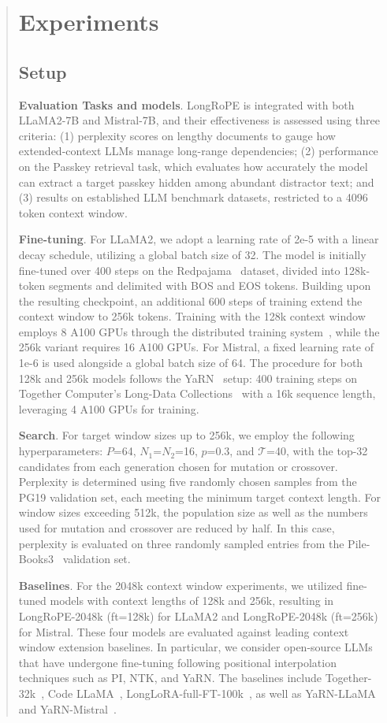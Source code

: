 \begin{abstract}
 \section{Experiments}

\label{sec:exp}
\subsection{Setup}
\textbf{Evaluation Tasks and models}. LongRoPE is integrated with both LLaMA2-7B and Mistral-7B, and their effectiveness is assessed using three criteria: (1) perplexity scores on lengthy documents to gauge how extended-context LLMs manage long-range dependencies; (2) performance on the Passkey retrieval task, which evaluates how accurately the model can extract a target passkey hidden among abundant distractor text; and (3) results on established LLM benchmark datasets, restricted to a 4096 token context window.

\textbf{Fine-tuning}. For LLaMA2, we adopt a learning rate of 2e-5 with a linear decay schedule, utilizing a global batch size of 32. The model is initially fine-tuned over 400 steps on the Redpajama~\cite{redpajama} dataset, divided into 128k-token segments and delimited with BOS and EOS tokens. Building upon the resulting checkpoint, an additional 600 steps of training extend the context window to 256k tokens. Training with the 128k context window employs 8 A100 GPUs through the distributed training system~\cite{cube}, while the 256k variant requires 16 A100 GPUs. For Mistral, a fixed learning rate of 1e-6 is used alongside a global batch size of 64. The procedure for both 128k and 256k models follows the YaRN~\cite{yarn} setup: 400 training steps on Together Computer's Long-Data Collections~\cite{mistraldata} with a 16k sequence length, leveraging 4 A100 GPUs for training.

\textbf{Search}. For target window sizes up to 256k, we employ the following hyperparameters: $P$=64, $N_1$=$N_2$=16, $p$=0.3, and $\mathcal{T}$=40, with the top-32 candidates from each generation chosen for mutation or crossover. Perplexity is determined using five randomly chosen samples from the PG19 validation set, each meeting the minimum target context length. For window sizes exceeding 512k, the population size as well as the numbers used for mutation and crossover are reduced by half. In this case, perplexity is evaluated on three randomly sampled entries from the Pile-Books3~\cite{pile} validation set.

\textbf{Baselines}. For the 2048k context window experiments, we utilized fine-tuned models with context lengths of 128k and 256k, resulting in LongRoPE-2048k (ft=128k) for LLaMA2 and LongRoPE-2048k (ft=256k) for Mistral. These four models are evaluated against leading context window extension baselines. In particular, we consider open-source LLMs that have undergone fine-tuning following positional interpolation techniques such as PI, NTK, and YaRN. The baselines include Together-32k~\cite{together}, Code LLaMA~\cite{codellama}, LongLoRA-full-FT-100k~\cite{longlora}, as well as YaRN-LLaMA and YaRN-Mistral~\cite{yarn}.


\end{abstract}
